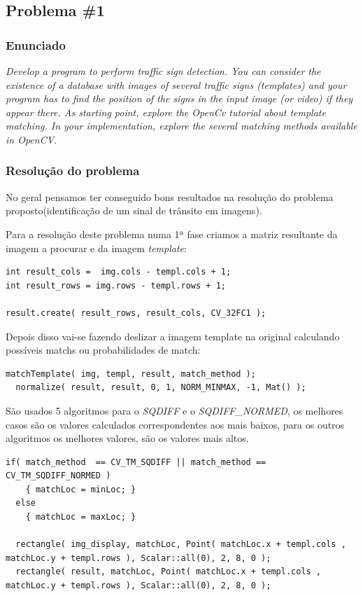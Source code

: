 \documentclass[portuguese, times, mirror]{revdetua}
\begin{document}
\subsection{Problema \#1 }

\subsubsection{Enunciado}
\textit{Develop a program to perform traffic sign detection. You can consider the existence of a database with images of several traffic signs (templates) and your program has to find the position of the signs in the input image (or video) if they appear there.
As starting point, explore the OpenCv tutorial about template matching. In your implementation, explore the several matching methods available in OpenCV.}


\subsubsection{Resolução do problema}

No geral pensamos ter conseguido bons resultados na resolução do problema proposto(identificação de um sinal de trânsito em imagens).

Para a resolução deste problema numa 1ª fase criamos a matriz resultante da imagem a procurar e da imagem \textit{template}:

\begin{lstlisting}[caption=Create the result matrix,label=code:C]
int result_cols =  img.cols - templ.cols + 1;
int result_rows = img.rows - templ.rows + 1;

result.create( result_rows, result_cols, CV_32FC1 );
\end{lstlisting}

Depois disso vai-se fazendo deslizar a imagem template na original calculando possíveis matchs ou probabilidades de match:

\begin{lstlisting}[caption=Matching and Normalize,label=code:C]
  matchTemplate( img, templ, result, match_method );
  normalize( result, result, 0, 1, NORM_MINMAX, -1, Mat() );
\end{lstlisting}

São usados 5 algoritmos para o \textit{SQDIFF} e o \textit{SQDIFF\_NORMED}, os melhores casos são os valores calculados correspondentes aos mais baixos, para os outros algoritmos os melhores valores, são os valores mais altos.

\begin{lstlisting}[caption=Desenho de retangulos no ponto de interesse,label=code:C]
if( match_method  == CV_TM_SQDIFF || match_method == CV_TM_SQDIFF_NORMED )
    { matchLoc = minLoc; }
  else
    { matchLoc = maxLoc; }

  rectangle( img_display, matchLoc, Point( matchLoc.x + templ.cols , matchLoc.y + templ.rows ), Scalar::all(0), 2, 8, 0 );
  rectangle( result, matchLoc, Point( matchLoc.x + templ.cols , matchLoc.y + templ.rows ), Scalar::all(0), 2, 8, 0 );
\end{lstlisting}
\end{document}

